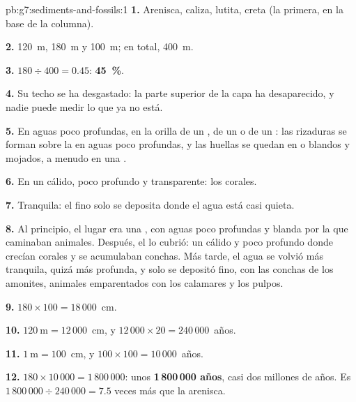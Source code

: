 \begin{solution}{pb:g7:sediments-and-fossils:1}
\textbf{1.} Arenisca, caliza, lutita, creta (la primera, en la base de la
columna).

\textbf{2.} \qty{120}{m}, \qty{180}{m} y \qty{100}{m}; en total,
\qty{400}{m}.

\textbf{3.} $180 \div 400 = 0.45$: \textbf{45~\%}.

\textbf{4.} Su techo se ha desgastado: la parte superior de la capa ha
desaparecido, y nadie puede medir lo que ya no está.

\textbf{5.} En aguas poco profundas, en la orilla de un , de un  o
de un : las rizaduras se forman sobre la  en aguas poco profundas,
y las huellas se quedan en  o  blandos y mojados, a menudo en
una .

\textbf{6.} En un  cálido, poco profundo y transparente: los corales.

\textbf{7.} Tranquila: el  fino solo se deposita donde el agua está casi quieta.

\textbf{8.} Al principio, el lugar era una , con aguas poco profundas
y  blanda por la que caminaban animales. Después, el  lo cubrió:
un  cálido y poco profundo donde crecían corales y se acumulaban
conchas. Más tarde, el agua se volvió más tranquila, quizá más profunda, y
solo se depositó  fino, con las conchas de los amonites, animales
emparentados con los calamares y los pulpos.

\textbf{9.} $180 \times 100 = 18\,000$~cm.

\textbf{10.} $120~\text{m} = 12\,000$~cm, y $12\,000 \times 20 =
240\,000$~años.

\textbf{11.} $1~\text{m} = 100$~cm, y $100 \times 100 = 10\,000$~años.

\textbf{12.} $180 \times 10\,000 = 1\,800\,000$: unos
\textbf{1\,800\,000 años}, casi dos millones de años. Es
$1\,800\,000 \div 240\,000 = 7.5$ veces más que la arenisca.
\end{solution}
